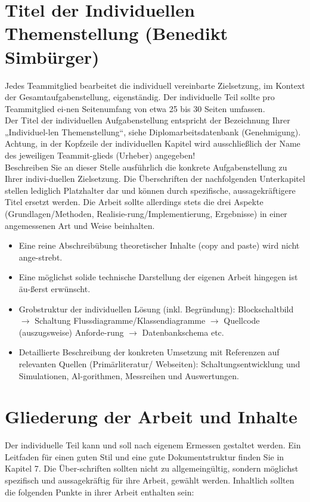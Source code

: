 \documentclass{article}
\begin{document}
\color{black}
\newpage
\section{Titel der Individuellen Themenstellung (Benedikt Simbürger)}
\color{blue}
Jedes Teammitglied bearbeitet die individuell vereinbarte Zielsetzung, im Kontext der Gesamtaufgabenstellung, eigenständig. Der individuelle Teil sollte pro Teammitglied ei-nen Seitenumfang von etwa 25 bis 30 Seiten umfassen.\\
Der Titel der individuellen Aufgabenstellung entspricht der Bezeichnung Ihrer „Individuel-len Themenstellung“, siehe Diplomarbeitsdatenbank (Genehmigung). Achtung, in der Kopfzeile der individuellen Kapitel wird ausschließlich der Name des jeweiligen Teammit-glieds (Urheber) angegeben!\\
Beschreiben Sie an dieser Stelle ausführlich die konkrete Aufgabenstellung zu Ihrer indivi-duellen Zielsetzung. Die Überschriften der nachfolgenden Unterkapitel stellen lediglich Platzhalter dar und können durch spezifische, aussagekräftigere Titel ersetzt werden. Die Arbeit sollte allerdings stets die drei Aspekte (Grundlagen/Methoden, Realisie-rung/Implementierung, Ergebnisse) in einer angemessenen Art und Weise beinhalten.\\

\begin{itemize}
    \item Eine reine Abschreibübung theoretischer Inhalte (copy and paste) wird nicht ange-strebt.
    \item Eine möglichst solide technische Darstellung der eigenen Arbeit hingegen ist äu-ßerst erwünscht.
    \item Grobstruktur der individuellen Lösung (inkl. Begründung): Blockschaltbild \(\rightarrow\) Schaltung  Flussdiagramme/Klassendiagramme \(\rightarrow\) Quellcode (auszugsweise) \textbar Anforde-rung \(\rightarrow\) Datenbankschema \textbar etc.
    \item Detaillierte Beschreibung der konkreten Umsetzung mit Referenzen auf relevanten Quellen (Primärliteratur/ Webseiten): Schaltungsentwicklung und Simulationen, Al-gorithmen, Messreihen und Auswertungen.
\end{itemize}

\section*{Gliederung der Arbeit und Inhalte}
Der individuelle Teil kann und soll nach eigenem Ermessen gestaltet werden. Ein Leitfaden für einen guten Stil und eine gute Dokumentstruktur finden Sie in Kapitel 7. Die Über-schriften sollten nicht zu allgemeingültig, sondern möglichst spezifisch und aussagekräftig für ihre Arbeit, gewählt werden. Inhaltlich sollten die folgenden Punkte in ihrer Arbeit enthalten sein:
\end{document}

